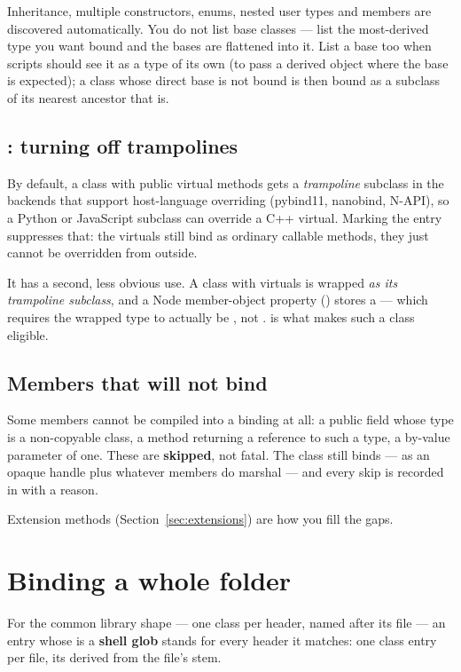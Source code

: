Inheritance, multiple constructors, enums, nested user types and
 members are discovered automatically. You do not list base
classes --- list the most-derived type you want bound and the bases are
flattened into it. List a base too when scripts should see it as a type of its
own (to pass a derived object where the base is expected); a class whose direct
base is not bound is then bound as a subclass of its nearest ancestor that is.

\subsection{: turning off trampolines}

By default, a class with public virtual methods gets a \emph{trampoline}
subclass in the backends that support host-language overriding (pybind11,
nanobind, N-API), so a Python or JavaScript subclass can override a C++ virtual. Marking
the entry  suppresses that: the virtuals still bind as
ordinary callable methods, they just cannot be overridden from outside.

It has a second, less obvious use. A class with virtuals is wrapped \emph{as
its trampoline subclass}, and a Node member-object property
() stores a  --- which requires the wrapped type to
actually be , not .  is what makes such a class
eligible.

\subsection{Members that will not bind}

Some members cannot be compiled into a binding at all: a public field whose type
is a non-copyable class, a method returning a reference to such a type, a
by-value parameter of one. These are \textbf{skipped}, not fatal. The class
still binds --- as an opaque handle plus whatever members do marshal --- and
every skip is recorded in  with a reason.

Extension methods (Section~\ref{sec:extensions}) are how you fill the gaps.

\section{Binding a whole folder}
\label{sec:globs}

For the common library shape --- one class per header, named after its file ---
an entry whose  is a \textbf{shell glob} stands for every header
it matches: one class entry per file, its  derived from the file's
stem.

